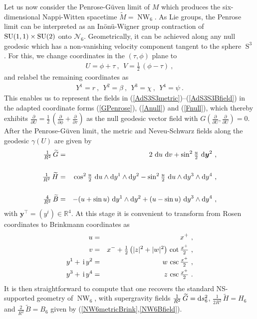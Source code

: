 \documentclass[11pt,a4paper]{article}
\DeclareMathOperator{\Sphere}{S}
\DeclareMathOperator{\NW}{NW}
\let\S\Sphere
\newcommand{\ii}{{\rm i}}
\newcommand{\mbf}[1]{{\boldsymbol {#1} }}
\def\ii{{\,{\rm i}\,}}
\def\dd{{\rm d}}
\newcommand{\real}{{\mathbb R}} %
\def\nn{\nonumber}
\def\bea{\begin{eqnarray}}
\def\eea{\end{eqnarray}}
\newcommand{\beq}{\begin{eqnarray}}
\newcommand{\eeq}{\end{eqnarray}}
\begin{document}
Let us now consider the Penrose-G\"uven limit of $M$ which produces the
six-dimensional Nappi-Witten spacetime $\widetilde{M}=\NW_6$. As Lie
groups, the Penrose limit can be interpreted as an In\"on\"u-Wigner
group contraction of ${\rm SU}(1,1)\times{\rm SU}(2)$ onto
$\mathcal{N}_6$. Geometrically, it can
be achieved along any null geodesic which has a
non-vanishing velocity component tangent to the sphere $\S^3$. For
this, we change coordinates in the $(\tau,\phi)$ plane to
\beq
U=\phi+\tau \ , ~~ V=\mbox{$\frac12$}\,(\phi-\tau) \ ,
\label{UVAdS3S3def}\eeq
and relabel the remaining coordinates as
\beq
Y^1=r \ , ~~ Y^2=\beta \ , ~~ Y^3=\chi \ , ~~ Y^4=\psi \ .
\label{Yrelabel}\eeq
This enables us to represent the fields in
(\ref{AdS3S3metric})--(\ref{AdS3S3Bfield}) in the adapted coordinate
forms (\ref{GPenrose}), (\ref{Anull}) and (\ref{Fnull}),  which
thereby exhibits $\frac\partial{\partial
  U}=\frac12\,(\frac\partial{\partial\phi}+\frac\partial{\partial\tau})$
as the null geodesic vector field with $G(\frac\partial{\partial
  U},\frac\partial{\partial U})=0$. After the Penrose-G\"uven limit,
the metric and Neveu-Schwarz fields along the geodesic $\gamma(U)$ are
given by
\bea
\mbox{$\frac1{R^2}$}\,\widetilde{G}&=&2~\dd u~\dd v+\sin^2\mbox{$
\frac u2$}~\dd{\mbf y}^2 \ , \label{NW6tildemetric}\\&&{~~~~}^{~~}_{~~}\nn\\
\mbox{$\frac1{R^2}$}\,\widetilde{H}&=&\cos^2\mbox{$\frac u2$}~\dd u
\wedge\dd y^1\wedge\dd y^2-\sin^2\mbox{$\frac u2$}~\dd u\wedge\dd y^3
\wedge\dd y^4 \ , \label{NW6tildeflux}\\&&{~~~~}^{~~}_{~~}\nn\\
\mbox{$\frac4{R^2}$}\,
\widetilde{B}&=&-(u+\sin u)~\dd y^1\wedge\dd y^2+(u-\sin u)~
\dd y^3\wedge\dd y^4 \ ,
\label{NW6tildeBfield}\eea
with ${\mbf y}^\top=(y^i)\in\real^4$. At this stage it is convenient to
transform from Rosen coordinates to Brinkmann coordinates as
\bea
u&=&x^+ \ , \nn\\v&=&x^-+\mbox{$\frac12$}\,\bigl(|z|^2+|w|^2\bigr)\,
\cot\mbox{$\frac{x^+}2$} \ , \nn\\y^1+\ii y^2&=&w\,\csc\mbox{$\frac{x^+}2$} \ ,
\nn\\y^3+\ii y^4&=&z\,\csc\mbox{$\frac{x^+}2$} \ .
\label{BrinkfromAdS3S3}\eea
It is then straightforward to compute that one recovers the standard
NS-supported geometry of $\NW_6$, with supergravity fields
$\frac1{R^2}\,\widetilde{G}=\dd s_6^2$,
$\frac1{2R^2}\,\widetilde{H}=H_6$ and $\frac2{R^2}\,\widetilde{B}=B_6$
given by (\ref{NW6metricBrink},\ref{NW6Bfield}).
\end{document}
